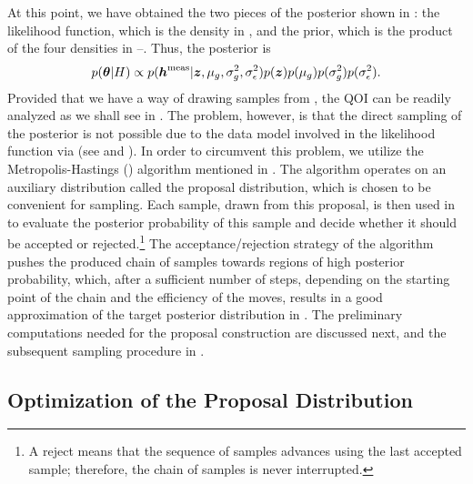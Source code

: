 At this point, we have obtained the two pieces of the posterior shown in
: the likelihood function, which is the density in
, and the prior, which is the product of the four densities in
--. Thus, the posterior is
\begin{equation} \elab{posterior}
  p(\vt | H) \propto p(\vh^\measured | \vz, \mu_\g, \sigma^2_\g, \sigma^2_\epsilon) p(\vz) p(\mu_\g) p(\sigma^2_\g) p(\sigma^2_\epsilon).
\end{equation}
Provided that we have a way of drawing samples from , the
\ac{QOI} can be readily analyzed as we shall see in . The
problem, however, is that the direct sampling of the posterior is not possible
due to the data model involved in the likelihood function via \vh (see
 and ). In order to circumvent this problem,
we utilize the Metropolis-Hastings () algorithm \cite{gelman2004}
mentioned in . The algorithm operates on an auxiliary
distribution called the proposal distribution, which is chosen to be convenient
for sampling. Each sample, drawn from this proposal, is then used in
 to evaluate the posterior probability of this sample and decide
whether it should be accepted or rejected.\footnote{A reject means that the
sequence of samples advances using the last accepted sample; therefore, the
chain of samples is never interrupted.} The acceptance/rejection strategy of the
 algorithm pushes the produced chain of samples towards regions of high
posterior probability, which, after a sufficient number of steps, depending on
the starting point of the chain and the efficiency of the moves, results in a
good approximation of the target posterior distribution in . The
preliminary computations needed for the proposal construction are discussed
next, and the subsequent sampling procedure in .

\subsection{Optimization of the Proposal Distribution}

